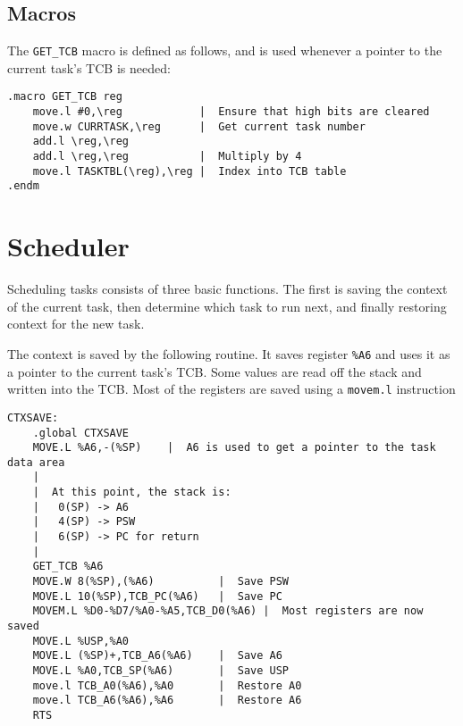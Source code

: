 \documentclass[10pt]{book}
\begin{document}
\subsection{Macros}

The \verb|GET_TCB| macro is defined as follows, and is used whenever a pointer to the current task's TCB is needed:
\begin{lstlisting}
.macro GET_TCB reg
    move.l #0,\reg            |  Ensure that high bits are cleared
    move.w CURRTASK,\reg      |  Get current task number
    add.l \reg,\reg
    add.l \reg,\reg           |  Multiply by 4
    move.l TASKTBL(\reg),\reg |  Index into TCB table
.endm
\end{lstlisting}

\section{Scheduler}
Scheduling tasks consists of three basic functions.  The first is saving the context of the current task, then determine which task to run next, and finally restoring context for the new task.

The context is saved by the following routine.  It saves register \verb|%A6| and uses it as a pointer to the current task's TCB.  Some values are read off the stack and written into the TCB.  Most of the registers are saved using a \verb|movem.l| instruction
\begin{lstlisting}
CTXSAVE:
    .global CTXSAVE
    MOVE.L %A6,-(%SP)    |  A6 is used to get a pointer to the task data area
    |
    |  At this point, the stack is:
    |   0(SP) -> A6
    |   4(SP) -> PSW
    |   6(SP) -> PC for return
    |
    GET_TCB %A6
    MOVE.W 8(%SP),(%A6)          |  Save PSW
    MOVE.L 10(%SP),TCB_PC(%A6)   |  Save PC
    MOVEM.L %D0-%D7/%A0-%A5,TCB_D0(%A6) |  Most registers are now saved
    MOVE.L %USP,%A0
    MOVE.L (%SP)+,TCB_A6(%A6)    |  Save A6
    MOVE.L %A0,TCB_SP(%A6)       |  Save USP
    move.l TCB_A0(%A6),%A0       |  Restore A0
    move.l TCB_A6(%A6),%A6       |  Restore A6
    RTS
\end{lstlisting}
\end{document}
